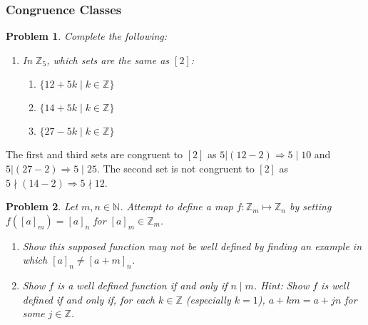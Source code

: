 \documentclass[12pt]{article}
\newtheorem{problem}{Problem}
\numberwithin{problem}{section} %
\theoremstyle{remark}  %
\newenvironment{answer}
    {\begin{adjustwidth}{0pt}{0pt}}
    {\end{adjustwidth}}
\begin{document}
\subsubsection{Congruence Classes}

    \setcounter{problem}{38}
    \begin{problem}
        Complete the following:
        \begin{enumerate}[label=(\alph*)]
            \item In $\mathbb{Z}_5$, which sets are the same as $[2]$:
            \begin{enumerate}[label=(\roman*)]
                \item $\{12+5k \mid k \in \mathbb{Z}\}$
                \item $\{14+5k \mid k \in \mathbb{Z}\}$
                \item $\{27-5k \mid k \in \mathbb{Z}\}$
            \end{enumerate}
        \end{enumerate}
    \end{problem}
    \begin{answer}
        The first and third sets are congruent to $[2]$ as $5|(12-2) \Rightarrow 5\mid 10$ and $5|(27-2) \Rightarrow 5\mid 25$. The second set is not congruent to $[2]$ as $5 \nmid (14-2) \Rightarrow 5 \nmid 12$.
    \end{answer}
\vspace{5pt}
    \setcounter{problem}{40}
    \begin{problem}
        Let $m,n\in\mathbb{N}$. Attempt to define a map $f\operatorname{:}\mathbb{Z}_m \mapsto \mathbb{Z}_n$ by setting $f([a]_m)=[a]_n$ for $[a]_m \in \mathbb{Z}_m$.
        \begin{enumerate}[label=(\alph*)]
            \item Show this supposed function may not be well defined by finding an example in which $[a]_n \neq [a+m]_n$.
            \item Show $f$ is a well defined function if and only if $n \mid m$. Hint: Show $f$ is well defined if and only if, for each $k \in \mathbb{Z}$ (especially $k=1$), $a+km=a+jn$ for some $j\in \mathbb{Z}$.
        \end{enumerate}
    \end{problem}
\end{document}
